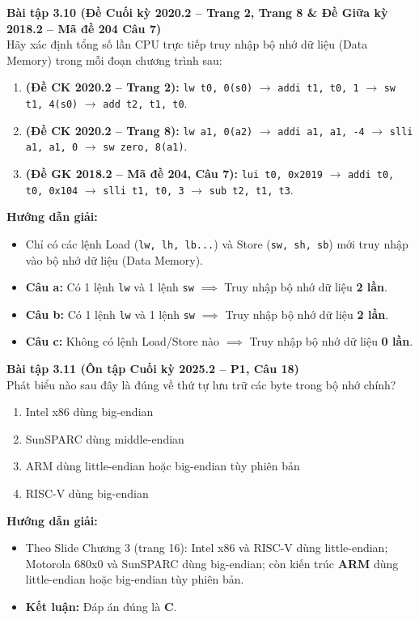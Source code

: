 \textbf{Bài tập 3.10 (Đề Cuối kỳ 2020.2 -- Trang 2, Trang 8 \& Đề Giữa kỳ 2018.2 -- Mã đề 204 Câu 7)}\\
Hãy xác định tổng số lần CPU trực tiếp truy nhập bộ nhớ dữ liệu (Data Memory) trong mỗi đoạn chương trình sau:
\begin{enumerate}[label=\alph*)]
    \item \textbf{(Đề CK 2020.2 -- Trang 2):} \texttt{lw t0, 0(s0)} $\rightarrow$ \texttt{addi t1, t0, 1} $\rightarrow$ \texttt{sw t1, 4(s0)} $\rightarrow$ \texttt{add t2, t1, t0}.
    \item \textbf{(Đề CK 2020.2 -- Trang 8):} \texttt{lw a1, 0(a2)} $\rightarrow$ \texttt{addi a1, a1, -4} $\rightarrow$ \texttt{slli a1, a1, 0} $\rightarrow$ \texttt{sw zero, 8(a1)}.
    \item \textbf{(Đề GK 2018.2 -- Mã đề 204, Câu 7):} \texttt{lui t0, 0x2019} $\rightarrow$ \texttt{addi t0, t0, 0x104} $\rightarrow$ \texttt{slli t1, t0, 3} $\rightarrow$ \texttt{sub t2, t1, t3}.
\end{enumerate}
\textbf{Hướng dẫn giải:}
\begin{itemize}
    \item Chỉ có các lệnh Load (\texttt{lw, lh, lb...}) và Store (\texttt{sw, sh, sb}) mới truy nhập vào bộ nhớ dữ liệu (Data Memory).
    \item \textbf{Câu a:} Có 1 lệnh \texttt{lw} và 1 lệnh \texttt{sw} $\implies$ Truy nhập bộ nhớ dữ liệu \textbf{2 lần}.
    \item \textbf{Câu b:} Có 1 lệnh \texttt{lw} và 1 lệnh \texttt{sw} $\implies$ Truy nhập bộ nhớ dữ liệu \textbf{2 lần}.
    \item \textbf{Câu c:} Không có lệnh Load/Store nào $\implies$ Truy nhập bộ nhớ dữ liệu \textbf{0 lần}.
\end{itemize}

\textbf{Bài tập 3.11 (Ôn tập Cuối kỳ 2025.2 -- P1, Câu 18)}\\
Phát biểu nào sau đây là đúng về thứ tự lưu trữ các byte trong bộ nhớ chính?
\begin{enumerate}[label=\Alph*.]
    \item Intel x86 dùng big-endian
    \item SunSPARC dùng middle-endian
    \item ARM dùng little-endian hoặc big-endian tùy phiên bản
    \item RISC-V dùng big-endian
\end{enumerate}
\textbf{Hướng dẫn giải:}
\begin{itemize}
    \item Theo Slide Chương 3 (trang 16): Intel x86 và RISC-V dùng little-endian; Motorola 680x0 và SunSPARC dùng big-endian; còn kiến trúc \textbf{ARM} dùng little-endian hoặc big-endian tùy phiên bản.
    \item \textbf{Kết luận:} Đáp án đúng là \textbf{C}.
\end{itemize}


